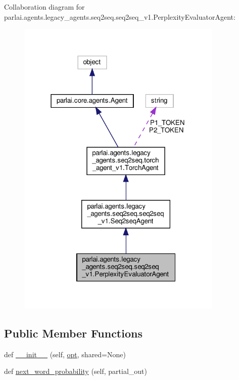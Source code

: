 Collaboration diagram for parlai.\+agents.\+legacy\+\_\+agents.\+seq2seq.\+seq2seq\+\_\+v1.\+Perplexity\+Evaluator\+Agent\+:
\nopagebreak
\begin{figure}[H]
\begin{center}
\leavevmode
\includegraphics[width=279pt]{d5/d37/classparlai_1_1agents_1_1legacy__agents_1_1seq2seq_1_1seq2seq__v1_1_1PerplexityEvaluatorAgent__coll__graph}
\end{center}
\end{figure}
\subsection*{Public Member Functions}
\begin{DoxyCompactItemize}
\item 
def \hyperlink{classparlai_1_1agents_1_1legacy__agents_1_1seq2seq_1_1seq2seq__v1_1_1PerplexityEvaluatorAgent_acf3daa1b1bfc893504efa07f3eb9b667}{\+\_\+\+\_\+init\+\_\+\+\_\+} (self, \hyperlink{classparlai_1_1agents_1_1legacy__agents_1_1seq2seq_1_1torch__agent__v1_1_1TorchAgent_a4e938a91873bd6edde0ac7ed5299bc6a}{opt}, shared=None)
\item 
def \hyperlink{classparlai_1_1agents_1_1legacy__agents_1_1seq2seq_1_1seq2seq__v1_1_1PerplexityEvaluatorAgent_a577da407eed3f8757efeab3522f2717b}{next\+\_\+word\+\_\+probability} (self, partial\+\_\+out)
\end{DoxyCompactItemize}
